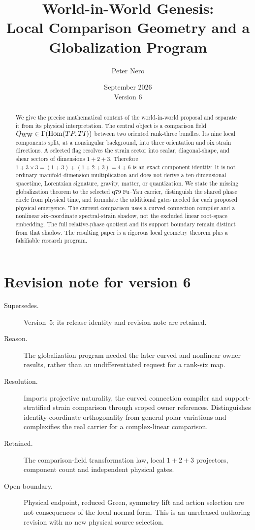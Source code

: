 \documentclass[11pt]{article}
\title{World-in-World Genesis:\\
Local Comparison Geometry and a Globalization Program}
\author{Peter Nero}
\date{September 2026\\Version 6}
\begin{document}
\maketitle

\begin{abstract}
We give the precise mathematical content of the world-in-world proposal and
separate it from its physical interpretation.  The central object is a
comparison field $Q_{\rm WW}\in\Gamma(\operatorname{Hom}(TP,TI))$ between two
oriented rank-three bundles.  Its nine local components split, at a nonsingular
background, into three orientation and six strain directions.  A selected
flag resolves the strain sector into scalar, diagonal-shape, and shear sectors
of dimensions $1+2+3$.  Therefore
$1+3\times3=(1+3)+(1+2+3)=4+6$ is an exact component identity.  It is not
ordinary manifold-dimension multiplication and does not derive a
ten-dimensional spacetime, Lorentzian signature, gravity, matter, or
quantization.  We state the missing globalization theorem to the selected q79
Fu--Yau carrier, distinguish the shared phase circle from physical time, and
formulate the additional gates needed for each proposed physical emergence.
The current comparison uses a curved connection compiler and a nonlinear
six-coordinate spectral-strain shadow, not the excluded linear root-space
embedding. The full relative-phase quotient and its support boundary remain
distinct from that shadow. The resulting paper is a rigorous local geometry
theorem plus a falsifiable research program.
\end{abstract}

\section*{Revision note for version 6}
\begin{description}
\item[Supersedes.] Version~5; its release identity and revision note are retained.
\item[Reason.] The globalization program needed the later curved and nonlinear
owner results, rather than an undifferentiated request for a rank-six map.
\item[Resolution.] Imports projective naturality, the curved connection
compiler and support-stratified strain comparison through scoped owner references.
Distinguishes identity-coordinate orthogonality from general polar variations
and complexifies the real carrier for a complex-linear comparison.
\item[Retained.] The comparison-field transformation law, local $1+2+3$
projectors, component count and independent physical gates.
\item[Open boundary.] Physical endpoint, reduced Green, symmetry lift and
action selection are not consequences of the local normal form. This is an
unreleased authoring revision with no new physical source selection.
\end{description}
\end{document}
